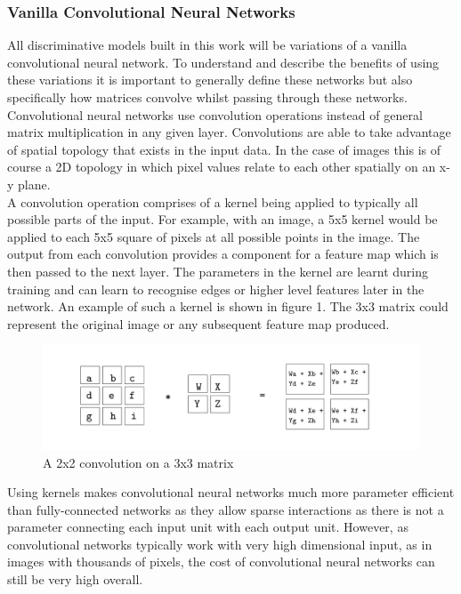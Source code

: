 \documentclass{article}
\begin{document}
\subsubsection{Vanilla Convolutional Neural Networks}
All discriminative models built in this work will be variations of a vanilla convolutional neural network. To understand and describe the benefits of using these variations it is important to generally define these networks but also specifically how matrices convolve whilst passing through these networks.\\

Convolutional neural networks use convolution operations instead of general matrix multiplication in any given layer. Convolutions are able to take advantage of spatial topology that exists in the input data. In the case of images this is of course a 2D topology in which pixel values relate to each other spatially on an x-y plane.\\

A convolution operation comprises of a kernel being applied to  typically all possible parts of the input. For example, with an image, a 5x5 kernel would be applied to each 5x5 square of pixels at all possible points in the image. The output from each convolution provides a component for a feature map which is then passed to the next layer. The parameters in the kernel are learnt during training and can learn to recognise edges or higher level features later in the network. An example of such a kernel is shown in figure 1. The 3x3 matrix could represent the original image or any subsequent feature map produced.\\

\begin{figure}
  \includegraphics[width=\linewidth]{convolutionexample.pdf}
  \caption{A 2x2 convolution on a 3x3 matrix}
  \label{fig:convolution}
\end{figure}


Using kernels makes convolutional neural networks much more parameter efficient than fully-connected networks as they allow sparse interactions as there is not a parameter connecting each input unit with each output unit. However, as convolutional networks typically work with very high dimensional input, as in images with thousands of pixels, the cost of convolutional neural networks can still be very high overall. \\
\end{document}
